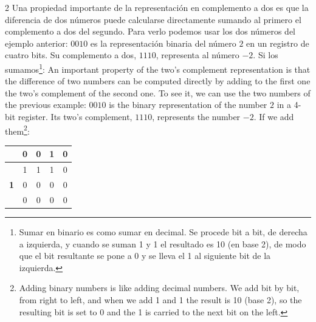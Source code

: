 \begin{paracol}{2}
 Una propiedad importante de la representación en complemento a dos es que la diferencia de dos números puede calcularse directamente sumando al primero el complemento a dos del segundo. Para verlo podemos usar los dos números del ejemplo anterior: $0010$ es la representación binaria del número $2$ en un registro de cuatro bits. Su complemento a dos, $1110$, representa al número $-2$. Si los sumamos\footnote{Sumar en binario es como sumar en decimal. Se procede bit a bit, de derecha a izquierda, y cuando se suman 1 y 1 el resultado es 10 (en base 2), de modo que el bit resultante se pone a 0 y se lleva el 1 al siguiente bit de la izquierda.}:
\switchcolumn
{} An important property of the two's complement representation is that the difference of two numbers can be computed directly by adding to the first one the two's complement of the second one. To see it, we can use the two numbers of the previous example: $0010$ is the binary representation of the number $2$ in a 4-bit register. Its two's complement, $1110$, represents the number $-2$. If we add them\footnote{Adding binary numbers is like adding decimal numbers. We add bit by bit, from right to left, and when we add 1 and 1 the result is 10 (base 2), so the resulting bit is set to 0 and the 1 is carried to the next bit on the left.}:
\end{paracol}

\begin{table}[H]
 \centering
\begin{tabular}{|c|c|c|c|c|}
\hline
 &0&0&1&0\\
 \hline
  &1&1&1&0\\
  \hline
  \textbf{1}&0&0&0&0\\
  \hline
  \hline
  &0&0&0&0\\
  \hline
\end{tabular}
\end{table}

